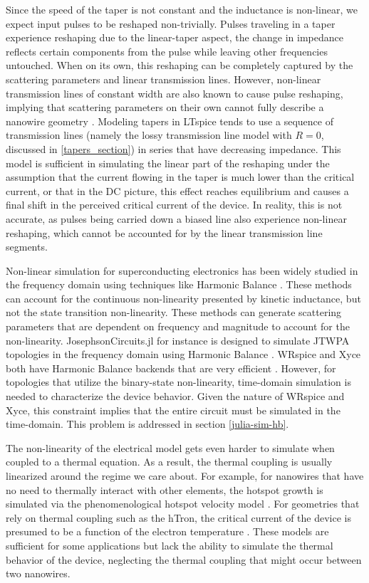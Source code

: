 Since the speed of the taper is not constant and the inductance is non-linear,
we expect input pulses to be reshaped non-trivially. Pulses traveling
in a taper experience reshaping due to the linear-taper aspect, the change in impedance
reflects certain components from the pulse while leaving other frequencies untouched.
When on its own, this reshaping can be completely captured by the scattering parameters and linear 
transmission lines. 
However,
non-linear transmission lines of constant width are also known to cause pulse reshaping, 
implying that scattering parameters on their own cannot fully describe a nanowire geometry
\cite{nl_tline_reshape}. 
Modeling tapers in LTspice tends to use a
sequence of transmission lines (namely the lossy transmission line model with $R=0$, 
discussed in \ref{tapers_section}) in series that have decreasing impedance. 
This model
is sufficient in simulating the linear part of the reshaping under the assumption
that the current flowing in the taper is much lower than the critical current, or
that in the DC picture, this effect reaches equilibrium and causes a final shift in the
perceived critical current of the device. In reality, this is not accurate, as pulses
being carried down a biased line also experience non-linear reshaping, which cannot
be accounted for by the linear transmission line segments.

Non-linear simulation for superconducting electronics has been widely studied in the 
frequency domain
using techniques like Harmonic Balance \cite{hb-book}. 
These methods can account for the continuous 
non-linearity presented by kinetic inductance, but not the state transition non-linearity.
These methods can generate scattering parameters that are dependent on frequency and
magnitude to account for the non-linearity.
JosephsonCircuits.jl for instance is designed
to simulate JTWPA topologies in the frequency domain using Harmonic Balance \cite{josephsoncircsjl}. WRspice
and Xyce both have Harmonic Balance backends that are very efficient \cite{wrspice, xyce_reference}. However,
for topologies that utilize the binary-state non-linearity, time-domain simulation 
is needed to characterize the device behavior. Given the nature of WRspice and Xyce,
this constraint implies that the entire circuit must be simulated in the time-domain. This problem is
addressed in section \ref{julia-sim-hb}.

The non-linearity of the electrical model gets even harder to simulate when coupled to
a thermal equation. As a result, the thermal coupling is usually linearized around the 
regime we care about. For example, for nanowires that have no need to thermally
interact with other elements, the hotspot growth is simulated via the phenomenological
hotspot velocity model \cite{phen_model, matteo_thesis}. 
For geometries that rely on thermal coupling such as the hTron, the critical current
of the device is presumed to be a function of the electron temperature \cite{matteo_thesis}.
These models are sufficient for some applications but lack the ability to simulate the thermal behavior of the device,
neglecting the thermal coupling that might occur between two nanowires.

